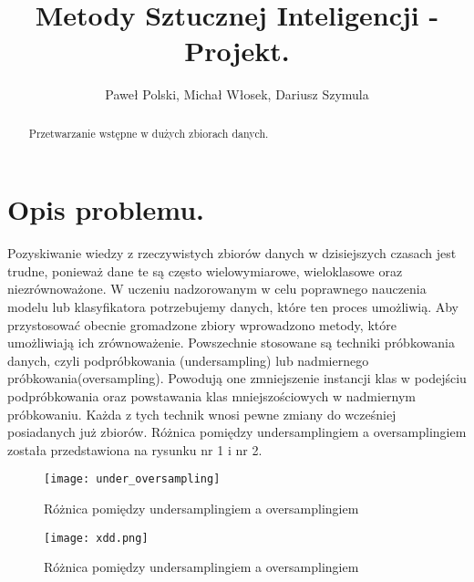\documentclass{article}
\begin{document}
\title{Metody Sztucznej Inteligencji - Projekt.}


\author{Paweł Polski, Michał Włosek, Dariusz Szymula}


\maketitle      
\begin{abstract}
\begin{center}
    Przetwarzanie wstępne w dużych zbiorach danych.
\end{center}
\end{abstract}



%
\section{Opis problemu.}
Pozyskiwanie wiedzy z rzeczywistych zbiorów danych w dzisiejszych czasach jest trudne, ponieważ dane te są często wielowymiarowe, wieloklasowe oraz niezrównoważone. W uczeniu nadzorowanym w celu poprawnego nauczenia modelu lub klasyfikatora potrzebujemy danych, które ten proces umożliwią. Aby przystosować obecnie gromadzone zbiory wprowadzono metody, które umożliwiają ich zrównoważenie. Powszechnie stosowane są techniki próbkowania danych, czyli podpróbkowania (undersampling) lub nadmiernego próbkowania(oversampling). Powodują one zmniejszenie instancji klas w podejściu podpróbkowania oraz powstawania klas mniejszościowych w nadmiernym próbkowaniu. Każda z tych technik wnosi pewne zmiany do wcześniej posiadanych już zbiorów. Różnica pomiędzy undersamplingiem a oversamplingiem została przedstawiona na rysunku nr 1 i nr 2.



\begin{figure}[h!]
\texttt{[image: under\_oversampling]}
\caption{Różnica pomiędzy undersamplingiem a oversamplingiem} 
\label{fig:under_oversampling}
\end{figure}
\break 
\begin{figure}[h!]
\texttt{[image: xdd.png]}
\caption{Różnica pomiędzy undersamplingiem a oversamplingiem} 
\label{fig:underoversampling}
\end{figure}
\end{document}
